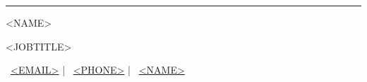 \documentclass[a4paper,11pt]{article}
\begin{document}
  \begin{center}\color{MidnightBlue}\rule{17cm}{3pt}\end{center}
  \vspace{-1.5ex}
  \begin{center}{\Huge \color{MidnightBlue}<NAME>}\end{center}
  \begin{center}{\huge \color{gray66}<JOBTITLE>}\end{center}

  \vspace{-3.5ex}
  \begin{center}\color{MidnightBlue}\small
  \faEnvelope \ \href{mailto:<EMAIL>}{<EMAIL>} | \faPhoneSquare \ \href{tel:<PHONE>}{<PHONE>} | \faLinkedinSquare \ \href{https://www.linkedin.com/in/<LINKEDIN_ID>/}{<NAME>}
  \end{center}

  \vspace{0.5cm}
  
  {\color{gray33}}

  \vspace{0.5cm}
  
\end{document}

